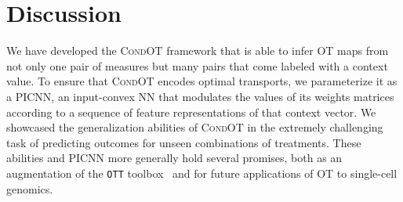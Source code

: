 \section{Discussion}
We have developed the \textsc{CondOT} framework that is able to infer OT maps from not only one pair of measures but many pairs that come labeled with a context value. To ensure that \textsc{CondOT} encodes optimal transports, we parameterize it as a PICNN, an input-convex NN that modulates the values of its weights matrices according to a sequence of feature representations of that context vector. We showcased the generalization abilities of \textsc{CondOT} in the extremely challenging task of predicting outcomes for unseen combinations of treatments. These abilities and PICNN more generally hold several promises, both as an augmentation of the \texttt{OTT} toolbox~\citep{cuturi2022optimal} and for future applications of OT to single-cell genomics.
